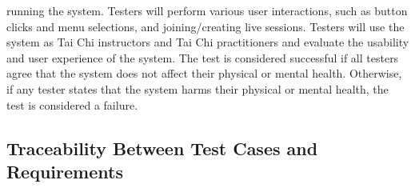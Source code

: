 \documentclass[12pt, titlepage]{article}
\begin{document}
\begin{enumerate}[NFR-T1]
\begin{description}
    running the system. Testers will perform various user interactions, such as
    button clicks and menu selections, and joining/creating live sessions.
    Testers will use the system as Tai Chi instructors and Tai Chi practitioners
    and evaluate the usability and user experience of the system. The test is
    considered successful if all testers agree that the system does not affect
    their physical or mental health. Otherwise, if any tester states that the
    system harms their physical or mental health, the test is considered a
    failure.
  \end{description}
\end{enumerate}

\subsection{Traceability Between Test Cases and Requirements}
\end{document}
